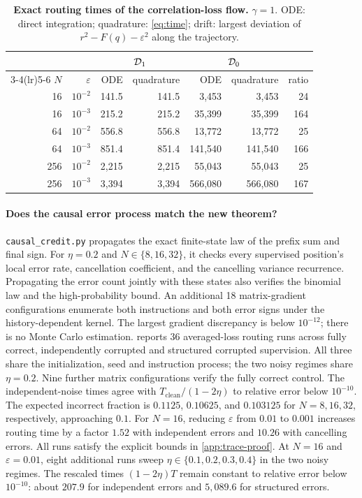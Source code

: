 \begin{table}[t]
\caption{\textbf{Exact routing times of the correlation-loss flow.} $\gamma=1$. ODE: direct integration; quadrature: \cref{eq:time}; drift:
largest deviation of $r^2-F(q)-\varepsilon^2$ along the trajectory.}
\label{tab:quadrature}
\centering\small
\begin{tabular}{@{}rr rr rr r@{}}
\toprule
 & & \multicolumn{2}{c}{$\mathcal D_{1}$} & \multicolumn{2}{c}{$\mathcal D_{0}$} & \\
\cmidrule(lr){3-4}\cmidrule(lr){5-6}
$N$ & $\varepsilon$ & ODE & quadrature & ODE & quadrature & ratio\\
\midrule
16  & $10^{-2}$ & 141.5  & 141.5  & 3{,}453   & 3{,}453   & 24\\
16  & $10^{-3}$ & 215.2  & 215.2  & 35{,}399  & 35{,}399  & 164\\
64  & $10^{-2}$ & 556.8  & 556.8  & 13{,}772  & 13{,}772  & 25\\
64  & $10^{-3}$ & 851.4  & 851.4  & 141{,}540 & 141{,}540 & 166\\
256 & $10^{-2}$ & 2{,}215 & 2{,}215 & 55{,}043  & 55{,}043  & 25\\
256 & $10^{-3}$ & 3{,}394 & 3{,}394 & 566{,}080 & 566{,}080 & 167\\
\bottomrule
\end{tabular}
\end{table}

\paragraph{Does the causal error process match the new theorem?}
\texttt{causal\_credit.py} propagates the exact finite-state law of the prefix sum and final sign.
For $\eta=0.2$ and $N\in\{8,16,32\}$, it checks every supervised position's local error rate, cancellation coefficient, and the cancelling variance recurrence.
Propagating the error count jointly with these states also verifies the binomial law and the high-probability bound.
An additional 18 matrix-gradient configurations enumerate both instructions and both error signs under the history-dependent kernel.
The largest gradient discrepancy is below $10^{-12}$; there is no Monte Carlo estimation.
 reports 36 averaged-loss routing runs across fully correct, independently corrupted and structured corrupted supervision.
All three share the initialization, seed and instruction process; the two noisy regimes share $\eta=0.2$.
Nine further matrix configurations verify the fully correct control.
The independent-noise times agree with $T_{\mathrm{clean}}/(1-2\eta)$ to relative error below $10^{-10}$.
The expected incorrect fraction is $0.1125$, $0.10625$, and $0.103125$ for $N=8,16,32$, respectively, approaching $0.1$.
For $N=16$, reducing $\varepsilon$ from $0.01$ to $0.001$ increases routing time by a factor $1.52$ with independent errors and $10.26$ with cancelling errors.
All runs satisfy the explicit bounds in \cref{app:trace-proof}.
At $N=16$ and $\varepsilon=0.01$, eight additional runs sweep $\eta\in\{0.1,0.2,0.3,0.4\}$ in the two noisy regimes.
The rescaled times $(1-2\eta)T$ remain constant to relative error below $10^{-10}$: about $207.9$ for independent errors and $5{,}089.6$ for structured errors.

